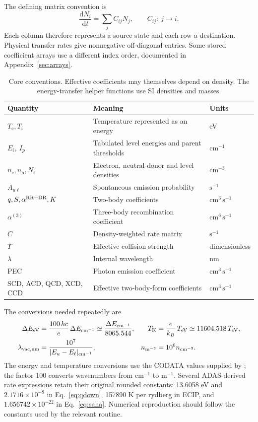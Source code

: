 \documentclass[11pt,a4paper]{article}
\newcommand{\code}[1]{\texttt{\detokenize{#1}}}
\newcommand{\dd}{\mathrm{d}}
\newcommand{\nelec}{n_{\mathrm e}}
\newcommand{\nh}{n_{\mathrm h}}
\newcommand{\Te}{T_{\mathrm e}}
\numberwithin{equation}{section}
\begin{document}
The defining matrix convention is
\begin{equation}\label{eq:matrix-convention}
 \frac{\dd N_i}{\dd t}=\sum_j C_{ij}N_j,
 \qquad C_{ij}:\ j\longrightarrow i.
\end{equation}
Each column therefore represents a source state and each row a
destination. Physical transfer rates give nonnegative off-diagonal
entries. Some stored coefficient arrays use a different index order,
documented in Appendix~\ref{sec:arrays}.

\begin{table}[htbp]\centering\small
\begin{tabularx}{\textwidth}{lXl}
\toprule Quantity & Meaning & Units\\\midrule
$\Te,T_i$ & Temperature represented as an energy & eV\\
$E_i,\ I_p$ & Tabulated level energies and parent thresholds & $\mathrm{cm}^{-1}$\\
$\nelec,\nh,N_i$ & Electron, neutral-donor and level densities & $\mathrm{cm}^{-3}$\\
$A_{u\ell}$ & Spontaneous emission probability & $\mathrm{s}^{-1}$\\
$q,S,\alpha^{\rm RR+DR},K$ & Two-body coefficients & $\mathrm{cm}^{3}\,\mathrm{s}^{-1}$\\
$\alpha^{(3)}$ & Three-body recombination coefficient & $\mathrm{cm}^{6}\,\mathrm{s}^{-1}$\\
$C$ & Density-weighted rate matrix & $\mathrm{s}^{-1}$\\
$\Upsilon$ & Effective collision strength & dimensionless\\
$\lambda$ & Internal wavelength & nm\\
PEC & Photon emission coefficient & $\mathrm{cm}^{3}\,\mathrm{s}^{-1}$\\
SCD, ACD, QCD, XCD, CCD & Effective two-body-form coefficients & $\mathrm{cm}^{3}\,\mathrm{s}^{-1}$\\
\bottomrule
\end{tabularx}
\caption{Core conventions. Effective coefficients may themselves depend on
density. The energy-transfer helper functions use SI densities and masses.}
\end{table}

The conversions needed repeatedly are
\begin{align}
 \Delta E_{\rm eV}&=\frac{100\,hc}{e}\,\Delta E_{\rm cm^{-1}}
   \simeq\frac{\Delta E_{\rm cm^{-1}}}{8065.544}, &
 T_{\rm K}&=\frac{e}{k_B}\,T_{\rm eV}\simeq11604.518\,T_{\rm eV},\label{eq:conversion}\\
 \lambda_{\rm vac,nm}&=\frac{10^7}{|E_u-E_\ell|_{\rm cm^{-1}}}, &
 n_{\rm m^{-3}}&=10^6n_{\rm cm^{-3}}.
\end{align}
The energy and temperature conversions use the CODATA values supplied by
\code{scipy.constants}; the factor 100 converts wavenumbers from
cm$^{-1}$ to m$^{-1}$. Several ADAS-derived rate expressions retain
their original rounded constants: 13.6058 eV and
$2.1716\times10^{-8}$ in Eq.~\eqref{eq:qdown}, 157890 K per rydberg in
ECIP, and $1.656742\times10^{-22}$ in Eq.~\eqref{eq:saha}. Numerical
reproduction should follow the constants used by the relevant routine.
\end{document}
